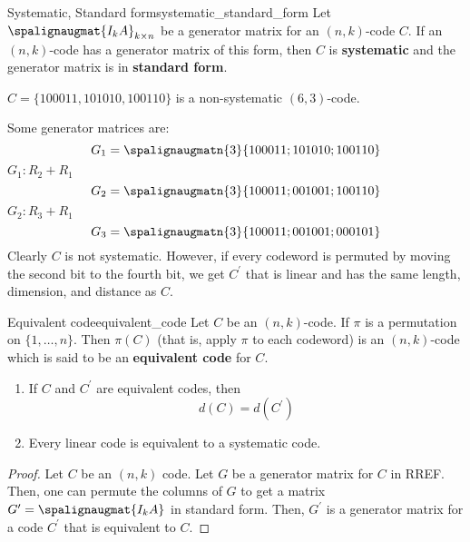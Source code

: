 \begin{Definition}{Systematic, Standard form}{systematic_standard_form}
    Let $ \spalignaugmat{I_k A}_{k\times n} $ be a generator matrix
    for an $ (n,k) $-code $ C $. If an $ (n,k) $-code has a generator
    matrix of this form, then $ C $ is \textbf{systematic} and the generator
    matrix is in \textbf{standard form}.
\end{Definition}

\begin{Example}{}{}
    $ C=\{100011,101010,100110\} $
    is a non-systematic $ (6,3) $-code.

    Some generator matrices are:
    \[ G_1=\spalignaugmatn{3}{
            1 0 0 0 1 1 ;
            1 0 1 0 1 0 ;
            1 0 0 1 1 0} \]
    $ G_1: R_2+R_1 $
    \[ G_2=\spalignaugmatn{3}{
            1 0 0 0 1 1 ;
            0 0 1 0 0 1 ;
            1 0 0 1 1 0} \]
    $ G_2: R_3+R_1 $
    \[ G_3=\spalignaugmatn{3}{
            1 0 0 0 1 1 ;
            0 0 1 0 0 1 ;
            0 0 0 1 0 1} \]
    Clearly $ C $ is not systematic. However, if every codeword
    is permuted by moving the second bit to the fourth bit, we get $ C^{\prime} $
    that is linear and has the same length, dimension, and distance as $ C $.
\end{Example}

\begin{Definition}{Equivalent code}{equivalent_code}
    Let $ C $ be an $ (n,k) $-code. If $ \pi $ is a permutation on
    $ \{1,\ldots ,n\} $. Then $ \pi(C) $ (that is, apply $ \pi $ to each
    codeword) is an $ (n,k) $-code which is said to be an \textbf{equivalent code}
    for $ C $.
\end{Definition}

\begin{Theorem}{}{}
    \begin{enumerate}[label=(\arabic*)]
        \item If $ C $ and $ C^{\prime} $ are equivalent codes, then
              \[ d(C)=d(C^{\prime}) \]
        \item Every linear code is equivalent to a systematic code.
    \end{enumerate}
\end{Theorem}

\begin{proof}
    Let $ C $ be an $ (n,k) $ code. Let $ G $ be a generator matrix for $ C $
    in RREF\@. Then, one can permute the columns of $ G $ to get a matrix
    $ G^{\prime}=\spalignaugmat{I_k A} $ in standard form. Then,
    $ G^{\prime} $ is a generator matrix for a code $ C^{\prime} $ that is
    equivalent to $ C $.
\end{proof}

